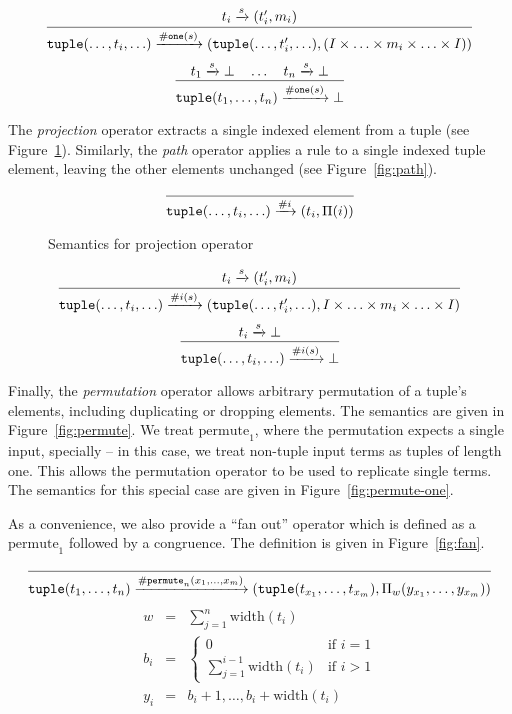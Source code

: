 \begin{figure*}[ht]
\[
\infer
  {\mathtt{tuple}(\ldots,t_i,\ldots) \arr{\mathtt{\#one}(s)} (\mathtt{tuple}(\ldots,t_i',\ldots),(I \times \ldots \times m_i \times \ldots \times I))}
  {t_i \arr{s} (t_i',m_i)}
\]
\[
\infer
  {\mathtt{tuple}(t_1,\ldots,t_n) \arr{\mathtt{\#one}(s)} \bot}
  {t_1 \arr{s} \bot \quad \ldots \quad t_n \arr{s} \bot}
\]
\caption{Semantics for branch-one operator}
\label{fig:branch}
\end{figure*}

The \emph{projection} operator extracts a single indexed element
from a tuple (see Figure~\ref{fig:projection}). Similarly, the
\emph{path} operator applies a rule to a single indexed tuple
element, leaving the other elements unchanged (see
Figure~\ref{fig:path}).

\begin{figure}[ht]
\[
\infer
  {\mathtt{tuple}(\ldots,t_i,\ldots) \arr{\#i} (t_i,\Pi(i))}
  {}
\]
\caption{Semantics for projection operator}
\label{fig:projection}
\end{figure}

\begin{figure*}[htb]
\[
\infer
  {\mathtt{tuple}(\ldots,t_i,\ldots) \arr{\#i(s)} (\mathtt{tuple}(\ldots,t_i',\ldots), I \times \ldots \times m_i \times \ldots \times I)}
  {t_i \arr{s} (t_i',m_i)}
\]
\[
\infer
  {\mathtt{tuple}(\ldots,t_i,\ldots) \arr{\#i(s)} \bot}
  {t_i \arr{s} \bot}
\]
\caption{Semantics for path operator}
\label{fig:path}
\end{figure*}

Finally, the \emph{permutation} operator allows arbitrary
permutation of a tuple's elements, including duplicating or
dropping elements. The semantics are given in
Figure~\ref{fig:permute}. We treat $\mbox{permute}_1$, where the
permutation expects a single input, specially -- in this case, we
treat non-tuple input terms as tuples of length one. This allows
the permutation operator to be used to replicate single terms. The
semantics for this special case are given in
Figure~\ref{fig:permute-one}.

As a convenience, we also provide a ``fan out'' operator which is
defined as a $\mbox{permute}_1$ followed by a congruence. The
definition is given in Figure~\ref{fig:fan}.

\begin{figure*}[htb]
\[
\infer
  {\mathtt{tuple}(t_1,\ldots,t_n) \arr{\mathtt{\#permute}_n(x_1,\ldots,x_m)} (\mathtt{tuple}(t_{x_1},\ldots,t_{x_m}),\Pi_w(y_{x_1},\ldots,y_{x_m}))}
  {}
\]
\begin{eqnarray*}
w   &=& \sum_{j=1}^n \mbox{width}(t_i)\\
b_i &=& \left\{
  \begin{array}{cl}
    0 & \mbox{if } i = 1\\
    \sum_{j=1}^{i-1} \mbox{width}(t_i) & \mbox{if } i > 1
  \end{array}
\right.\\
y_i &=& b_i+1,\ldots,b_i + \mbox{width}(t_i)
\end{eqnarray*}
\caption{Semantics for permutation operator}
\label{fig:permute}
\end{figure*}



